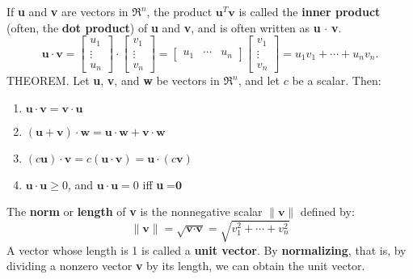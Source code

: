 \documentclass{article}
\begin{document}
If \textbf{u} and \textbf{v} are vectors in $\Re^n$, the product $\textbf{u}^T\textbf{v}$ is called the \textbf{inner product} (often, the \textbf{dot product}) of \textbf{u} and \textbf{v}, and is often written as \textbf{u} $\cdot$ \textbf{v}.
\begin{equation}
    \textbf{u}\cdot\textbf{v}=
    \begin{bmatrix}
    u_1 \\
    \vdots \\
    u_n
    \end{bmatrix} \cdot
    \begin{bmatrix}
    v_1 \\
    \vdots \\
    v_n
    \end{bmatrix} = 
    \begin{bmatrix}
    u_1 & \cdots & u_n
    \end{bmatrix}
    \begin{bmatrix}
    v_1 \\
    \vdots \\
    v_n
    \end{bmatrix}=
    u_1v_1 + \cdots + u_nv_n.
\end{equation}
\hfill \newline THEOREM. Let \textbf{u}, \textbf{v}, and \textbf{w} be vectors in $\Re^n$, and let $c$ be a scalar. Then: \begin{enumerate}
    \item $\textbf{u}\cdot\textbf{v}=\textbf{v}\cdot\textbf{u}$
    \item $(\textbf{u}+\textbf{v})\cdot\textbf{w}=\textbf{u}\cdot\textbf{w}+\textbf{v}\cdot\textbf{w}$
    \item $(c\textbf{u})\cdot\textbf{v} = c(\textbf{u}\cdot\textbf{v}) = \textbf{u} \cdot (c\textbf{v})$
    \item $\textbf{u}\cdot\textbf{u}\geq0$, and $\textbf{u}\cdot\textbf{u}=0$ iff \textbf{u}$=\textbf{0}$
\end{enumerate}

\hfill \newline The \textbf{norm} or \textbf{length} of \textbf{v} is the nonnegative scalar $\|\textbf{v}\|$ defined by:
\begin{equation}
    \|\textbf{v}\| = \sqrt{\textbf{v}\cdot\textbf{v}} = \sqrt{v_1^2+\cdots+v_n^2}
\end{equation}
\noindent A vector whose length is 1 is called a \textbf{unit vector}. By \textbf{normalizing}, that is, by dividing a nonzero vector \textbf{v} by its length, we can obtain the unit vector.
\end{document}
